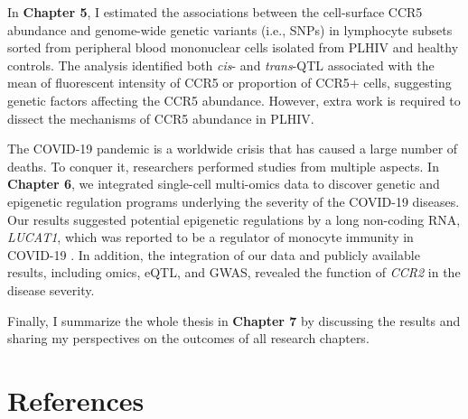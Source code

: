 \documentclass{book}
\begin{document}
\begin{refsection}
In \textbf{Chapter 5}, I estimated the associations between the cell-surface CCR5 abundance and genome-wide genetic variants (i.e., SNPs) in lymphocyte subsets sorted from peripheral blood mononuclear cells isolated from PLHIV and healthy controls.
The analysis identified both \textit{cis}- and \textit{trans}-QTL associated with the mean of fluorescent intensity of CCR5 or proportion of CCR5+ cells, suggesting genetic factors affecting the CCR5 abundance.
However, extra work is required to dissect the mechanisms of CCR5 abundance in PLHIV.

The COVID-19 pandemic is a worldwide crisis that has caused a large number of deaths.
To conquer it, researchers performed studies from multiple aspects.
In \textbf{Chapter 6}, we integrated single-cell multi-omics data to discover genetic and epigenetic regulation programs underlying the severity of the COVID-19 diseases.
Our results suggested potential epigenetic regulations by a long non-coding RNA, \textit{LUCAT1}, which was reported to be a regulator of monocyte immunity in COVID-19 \cite{Aznaourova2021Single}.
In addition, the integration of our data and publicly available results, including omics, eQTL, and GWAS, revealed the function of \textit{CCR2} in the disease severity.

Finally, I summarize the whole thesis in \textbf{Chapter 7} by discussing the results and sharing my perspectives on the outcomes of all research chapters.

\section*{References}
\printbibliography[heading=none]

\clearpage

\end{refsection}
\end{document}
